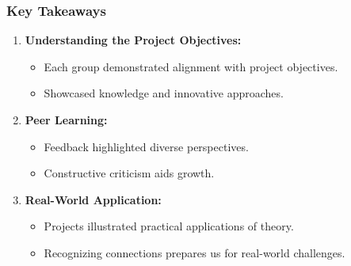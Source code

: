 \documentclass[aspectratio=169]{beamer}
\begin{document}
\begin{frame}[fragile]
    \frametitle{Key Takeaways}
    
    \begin{enumerate}
        \item \textbf{Understanding the Project Objectives:}
        \begin{itemize}
            \item Each group demonstrated alignment with project objectives.
            \item Showcased knowledge and innovative approaches.
        \end{itemize}
        
        \item \textbf{Peer Learning:}
        \begin{itemize}
            \item Feedback highlighted diverse perspectives.
            \item Constructive criticism aids growth.
        \end{itemize}
        
        \item \textbf{Real-World Application:}
        \begin{itemize}
            \item Projects illustrated practical applications of theory.
            \item Recognizing connections prepares us for real-world challenges.
        \end{itemize}
    \end{enumerate}
\end{frame}
\end{document}
